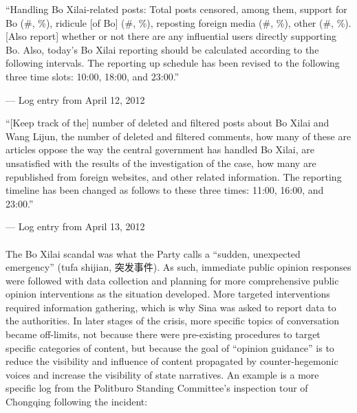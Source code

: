 \documentclass[12pt]{article}
\begin{document}
\begin{CJK*}{UTF8}{gbsn}
{
\epigraph{``Handling Bo Xilai-related posts: Total posts censored, among them, support for Bo (\#, \%), ridicule [of Bo] (\#, \%), reposting foreign media (\#, \%), other (\#, \%). [Also report] whether or not there are any influential users directly supporting Bo. Also, today's Bo Xilai reporting should be calculated according to the following intervals. The reporting up schedule has been revised to the following three time slots: 10:00, 18:00, and 23:00.''\footnotemark\newline}{--- Log entry from April 12, 2012}}

{
\epigraph{``[Keep track of the] number of deleted and filtered posts about Bo Xilai and Wang Lijun, the number of deleted and filtered comments, how many of these are articles oppose the way the central government has handled Bo Xilai, are unsatisfied with the results of the investigation of the case, how many are republished from foreign websites, and other related information. The reporting timeline has been changed as follows to these three times: 11:00, 16:00, and 23:00.''\footnotemark\newline}{--- Log entry from April 13, 2012}}

\paragraph{} The Bo Xilai scandal was what the Party calls a ``sudden, unexpected emergency'' (tufa shijian, 突发事件). As such, immediate public opinion responses were followed with data collection and planning for more comprehensive public opinion interventions as the situation developed. More targeted interventions required information gathering, which is why Sina was asked to report data to the authorities. In later stages of the crisis, more specific topics of conversation became off-limits, not because there were pre-existing procedures to target specific categories of content, but because the goal of ``opinion guidance'' is to reduce the visibility and influence of content propagated by counter-hegemonic voices and increase the visibility of state narratives. An example is a more specific log from the Politburo Standing Committee's inspection tour of Chongqing following the incident:


\end{CJK*}
\end{document}
